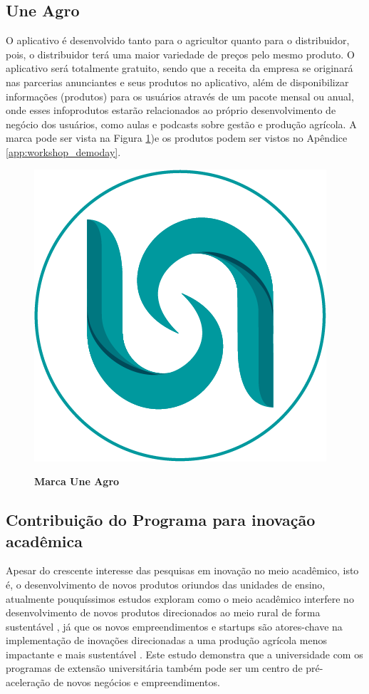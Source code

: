 \subsection{Une Agro}

O aplicativo é desenvolvido tanto para o agricultor quanto para o distribuidor, pois, o distribuidor terá uma maior variedade de preços pelo mesmo produto. O aplicativo será totalmente gratuito, sendo que a receita da empresa se originará nas parcerias anunciantes e seus produtos no aplicativo, além de disponibilizar informações (produtos) para os usuários através de um pacote mensal ou anual, onde esses infoprodutos estarão relacionados ao próprio desenvolvimento de negócio dos usuários, como aulas e podcasts sobre gestão e produção agrícola. A marca pode ser vista na Figura \ref{figura_28})e os produtos podem ser vistos no Apêndice \ref{app:workshop_demoday}.

\begin{figure}[H]
\centering
\caption{\textbf{Marca Une Agro}}
\includegraphics[scale=1.5]{Imagens/uneagro.png}
\label{figura_28}
\end{figure}




\subsection{Contribuição do Programa para inovação acadêmica}


Apesar do crescente interesse das pesquisas em inovação no meio acadêmico, isto é, o desenvolvimento de novos produtos oriundos das unidades de ensino, atualmente pouquíssimos estudos exploram como o meio acadêmico interfere no desenvolvimento de novos produtos direcionados ao meio rural de forma sustentável \cite{liu_new_2020}, já que os novos empreendimentos e startups são atores-chave na implementação de inovações direcionadas a uma produção agrícola menos impactante e mais sustentável \cite{fichter_impacts_2020}. Este estudo demonstra que a universidade com os programas de extensão universitária também pode ser um centro de pré-aceleração de novos negócios e  empreendimentos. 


